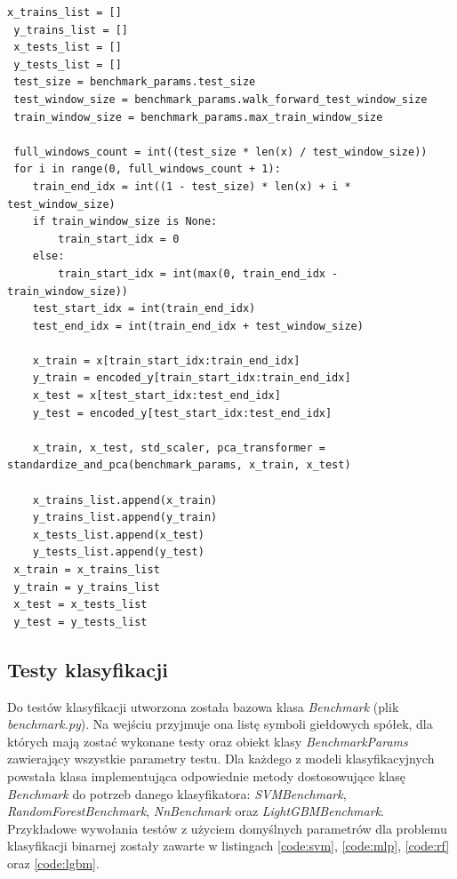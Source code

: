 \documentclass[a4paper, twoside, 11pt, openright]{article}
\begin{document}
\begin{lstlisting}[caption={Stworzenie zbiorów danych do testów metodą kroczącą (plik \textit{benchmark\_data\_preprocessing.py})}, label={code:walk_forward_data},frame=single, captionpos=b, mathescape=true]
 x_trains_list = []
 y_trains_list = []
 x_tests_list = []
 y_tests_list = []
 test_size = benchmark_params.test_size
 test_window_size = benchmark_params.walk_forward_test_window_size
 train_window_size = benchmark_params.max_train_window_size

 full_windows_count = int((test_size * len(x) / test_window_size))
 for i in range(0, full_windows_count + 1):
    train_end_idx = int((1 - test_size) * len(x) + i * test_window_size)
    if train_window_size is None:
        train_start_idx = 0
    else:
        train_start_idx = int(max(0, train_end_idx - train_window_size))
    test_start_idx = int(train_end_idx)
    test_end_idx = int(train_end_idx + test_window_size)

    x_train = x[train_start_idx:train_end_idx]
    y_train = encoded_y[train_start_idx:train_end_idx]
    x_test = x[test_start_idx:test_end_idx]
    y_test = encoded_y[test_start_idx:test_end_idx]

    x_train, x_test, std_scaler, pca_transformer = standardize_and_pca(benchmark_params, x_train, x_test)

    x_trains_list.append(x_train)
    y_trains_list.append(y_train)
    x_tests_list.append(x_test)
    y_tests_list.append(y_test)
 x_train = x_trains_list
 y_train = y_trains_list
 x_test = x_tests_list
 y_test = y_tests_list
\end{lstlisting}

\subsection*{Testy klasyfikacji}

Do testów klasyfikacji utworzona została bazowa klasa \textit{Benchmark} (plik \textit{benchmark.py}). Na wejściu przyjmuje ona listę symboli giełdowych spółek, dla których mają zostać wykonane testy oraz obiekt klasy \textit{BenchmarkParams} zawierający wszystkie parametry testu. Dla każdego z modeli klasyfikacyjnych powstała klasa implementująca odpowiednie metody dostosowujące klasę \textit{Benchmark} do potrzeb danego klasyfikatora: \textit{SVMBenchmark}, \textit{RandomForestBenchmark}, \textit{NnBenchmark} oraz \textit{LightGBMBenchmark}. Przykładowe wywołania testów z użyciem domyślnych parametrów dla problemu klasyfikacji binarnej zostały zawarte w listingach \ref{code:svm}, \ref{code:mlp}, \ref{code:rf} oraz \ref{code:lgbm}.
\end{document}
